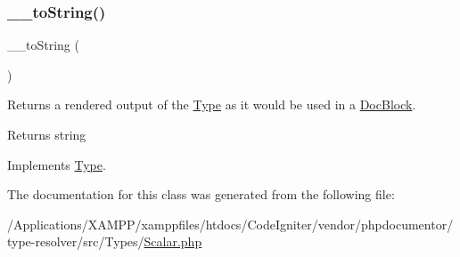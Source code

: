 \subsubsection{\texorpdfstring{\+\_\+\+\_\+to\+String()}{\_\_toString()}}
{\footnotesize\ttfamily \+\_\+\+\_\+to\+String (\begin{DoxyParamCaption}{ }\end{DoxyParamCaption})}

Returns a rendered output of the \mbox{\hyperlink{interfacephp_documentor_1_1_reflection_1_1_type}{Type}} as it would be used in a \mbox{\hyperlink{classphp_documentor_1_1_reflection_1_1_doc_block}{Doc\+Block}}.

\begin{DoxyReturn}{Returns}
string 
\end{DoxyReturn}


Implements \mbox{\hyperlink{interfacephp_documentor_1_1_reflection_1_1_type_a7516ca30af0db3cdbf9a7739b48ce91d}{Type}}.



The documentation for this class was generated from the following file\+:\begin{DoxyCompactItemize}
\item 
/\+Applications/\+X\+A\+M\+P\+P/xamppfiles/htdocs/\+Code\+Igniter/vendor/phpdocumentor/type-\/resolver/src/\+Types/\mbox{\hyperlink{_scalar_8php}{Scalar.\+php}}\end{DoxyCompactItemize}
